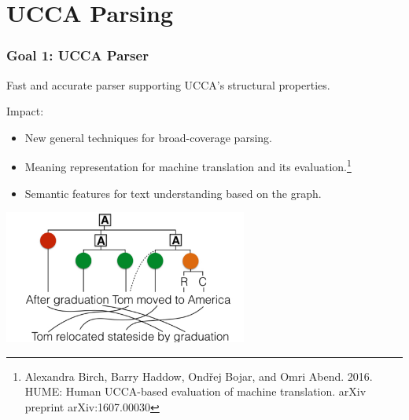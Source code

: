 \documentclass[t,handout,xcolor={svgnames}]{beamer}
\begin{document}
\section[]{UCCA Parsing}

\begin{frame}
\frametitle{Goal 1: UCCA Parser}
Fast and accurate parser supporting UCCA's structural properties.

\vspace*{\fill}
Impact:
\begin{itemize}
\item New general techniques for broad-coverage parsing.
\item Meaning representation for machine translation and its evaluation.\footnote{
Alexandra Birch, Barry Haddow, Ond\v{r}ej Bojar, and Omri Abend. 2016. HUME: Human UCCA-based
evaluation of machine translation. arXiv preprint arXiv:1607.00030}
\item Semantic features for text understanding based on the graph.

\vspace*{\fill}
\end{itemize}
\begin{center}
 \includegraphics[width=0.6\textwidth,keepaspectratio]{hume}
\end{center}
\end{frame}
\end{document}
